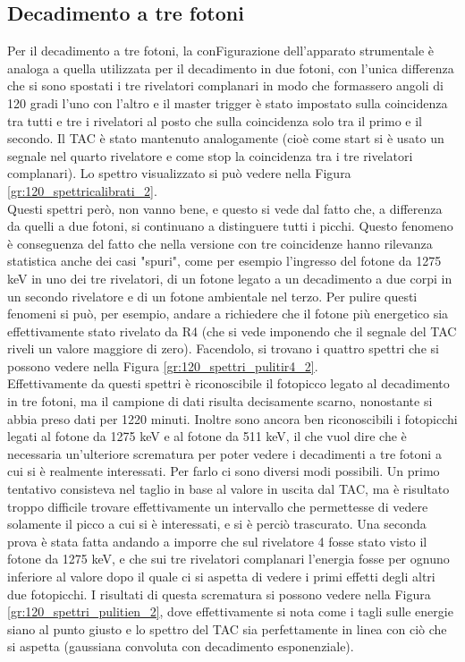 \subsection{Decadimento a tre fotoni}
Per il decadimento a tre fotoni, la conFigurazione dell'apparato strumentale è analoga a quella utilizzata per il decadimento in due fotoni, con l'unica differenza
che si sono spostati i tre rivelatori complanari in modo che formassero angoli di 120 gradi l'uno  con l'altro e il master trigger è stato impostato sulla coincidenza
tra tutti e tre i rivelatori al posto che sulla coincidenza solo tra il primo e il secondo. Il TAC è stato mantenuto analogamente (cioè come start si è usato un segnale
nel quarto rivelatore e come stop la coincidenza tra i tre rivelatori complanari). Lo spettro visualizzato si può vedere nella Figura \ref{gr:120_spettricalibrati_2}.\\


Questi spettri però, non vanno bene, e questo si vede dal fatto che, a differenza da quelli a due fotoni, si continuano a distinguere tutti i picchi. Questo fenomeno
è conseguenza del fatto che nella versione con tre coincidenze hanno rilevanza statistica anche dei casi "spuri", come per esempio l'ingresso del fotone da 1275 keV in uno dei tre rivelatori,
di un fotone legato a un decadimento a due corpi in un secondo rivelatore e di un fotone ambientale nel terzo. Per pulire questi fenomeni si può, per esempio, andare a
richiedere che il fotone più energetico sia effettivamente stato rivelato da R4 (che si vede imponendo che il segnale del TAC riveli un valore maggiore di zero). Facendolo,
si trovano i quattro spettri che si possono vedere nella Figura \ref{gr:120_spettri_pulitir4_2}.\\


Effettivamente da questi spettri è riconoscibile il fotopicco legato al decadimento in tre fotoni, ma il campione di dati risulta decisamente scarno, nonostante si abbia
preso dati per 1220 minuti. Inoltre sono ancora ben riconoscibili i fotopicchi legati al fotone da 1275 keV e al fotone da 511 keV, il che vuol dire che è necessaria 
un'ulteriore scrematura per poter vedere i decadimenti a tre fotoni a cui si è realmente interessati. Per farlo ci sono diversi modi possibili. Un primo tentativo consisteva
nel taglio in base al valore in uscita dal TAC, ma è risultato troppo difficile trovare effettivamente un intervallo che permettesse di vedere solamente il picco a cui
si è interessati, e si è perciò trascurato. Una seconda prova è stata fatta andando a imporre che sul rivelatore 4 fosse stato visto il fotone da 1275 keV, e che sui tre
rivelatori complanari l'energia fosse per ognuno inferiore al valore dopo il quale ci si aspetta di vedere i primi effetti degli altri due fotopicchi. I risultati
di questa scrematura si possono vedere nella Figura \ref{gr:120_spettri_pulitien_2}, dove effettivamente si nota come i tagli sulle energie siano al punto giusto e lo
spettro del TAC sia perfettamente in linea con ciò che si aspetta (gaussiana convoluta con decadimento esponenziale).\\


